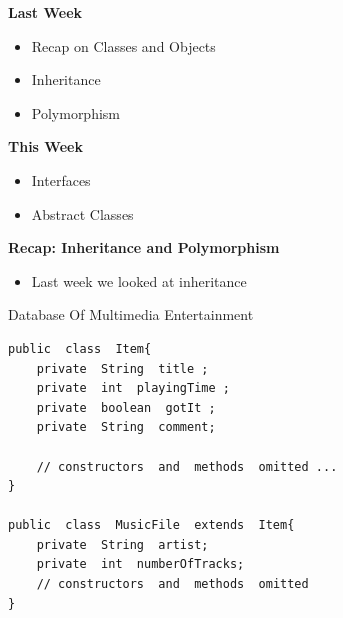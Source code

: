 \documentclass{beamer}
\begin{document}

\begin{frame}
\begin{center}
\textbf{Last Week}
\end{center} 
\begin{itemize}
\item Recap on Classes and Objects
\bigskip
\item Inheritance
\item Polymorphism
\end{itemize}
\end{frame}

\begin{frame}
\begin{center}
\textbf{This Week}
\end{center} 
\begin{itemize}
\item Interfaces 
\item Abstract Classes
\end{itemize}
\end{frame}

\begin{frame}
\begin{center}
\textbf{Recap: Inheritance and Polymorphism}
\end{center}
\end{frame}

\begin{frame}
\begin{itemize}
\item Last week we looked at inheritance
\end{itemize}
\end{frame}

\begin{frame}[fragile]
\begin{center}
\item Database Of Multimedia Entertainment 
\end{center}
\begin{block}{}
\begin{lstlisting}
public  class  Item{
    private  String  title ;
    private  int  playingTime ;
    private  boolean  gotIt ;
    private  String  comment;
    
    // constructors  and  methods  omitted ...
}

public  class  MusicFile  extends  Item{
    private  String  artist;
    private  int  numberOfTracks;
    // constructors  and  methods  omitted
}
\end{lstlisting}
\end{block}
\end{frame}
\end{document}
